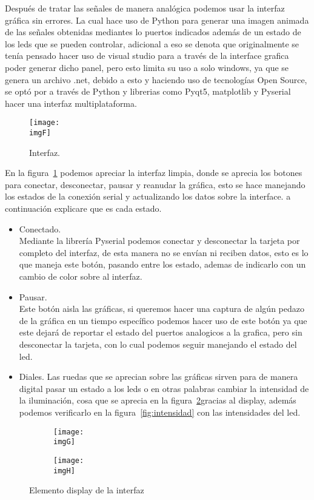 \documentclass[a4paper,12pt]{article}
\newcommand{\imgF}{img/principal.png}
\newcommand{\imgG}{img/poco.png}
\newcommand{\imgH}{img/mucho.png}
\begin{document}
    \noindent Después de tratar las señales de manera analógica podemos usar la interfaz gráfica sin errores. La cual hace uso de Python para  generar una imagen animada de las señales obtenidas mediantes lo puertos indicados además de un estado de los leds que se pueden controlar, adicional a eso se denota que originalmente se tenía pensado hacer uso de visual studio para a través de la interface grafica poder generar dicho panel, pero esto limita su uso a solo windows, ya que se genera un archivo .net, debido a esto y haciendo uso de tecnologías Open Source, se optó por a través de Python y librerias como Pyqt5, matplotlib y Pyserial hacer una interfaz multiplataforma.
    \begin{figure}[H] 
        \centering 
        \texttt{[image: \\imgF]} 
        \caption{Interfaz.} 
        \label{fig:F} 
    \end{figure} 
    En la figura~\ref{fig:F} podemos apreciar la interfaz limpia, donde se aprecia los botones para conectar, desconectar, pausar y reanudar la gráfica, esto se hace manejando los estados de la conexión serial y actualizando los datos sobre la interface. a continuación explicare que es cada estado.
    \begin{itemize}
    \item Conectado.\\
    Mediante la librería Pyserial podemos conectar y desconectar la tarjeta por completo del interfaz, de esta manera no se envían ni reciben datos, esto es lo que maneja este botón, pasando entre los estado, ademas de indicarlo con un cambio de color sobre al interfaz.
    \item Pausar.\\
    Este botón aisla las gráficas, si queremos hacer una captura de algún pedazo de la gráfica en un tiempo específico podemos hacer uso de este botón ya que este dejará de reportar el estado del puertos analogicos a la grafica, pero sin desconectar la tarjeta, con lo cual podemos seguir manejando el estado del led.
    \item Diales.
    Las ruedas que se aprecian sobre las gráficas sirven para de manera digital pasar un estado a los leds o en otras palabras cambiar la intensidad de la iluminación, cosa que se aprecia en la figura~\ref{fig:display}gracias al display, además podemos verificarlo en la figura~\ref{fig:intensidad}  con las intensidades del led.
    \end{itemize}

    \begin{figure}[H] 
        \centering 

        \begin{subfigure}{0.35\linewidth} 
            \texttt{[image: \\imgG]} 
        \end{subfigure} 

        \begin{subfigure}{0.35\textwidth} 
            \texttt{[image: \\imgH]} 
        \end{subfigure} 

        \caption{Elemento display de la interfaz} 
        \label{fig:display}
    \end{figure} 
\end{document}
